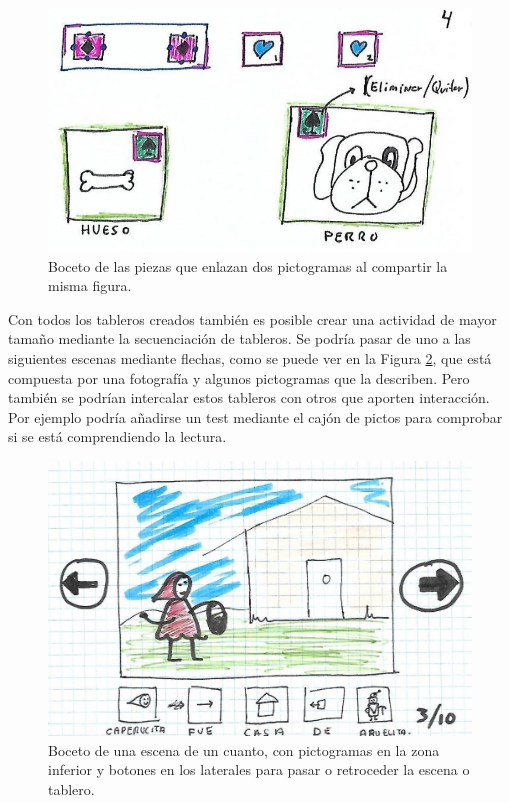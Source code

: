\begin{itemize}
	\begin{figure}[h!]
		\centering
		\includegraphics[width=0.7\linewidth]{Imagenes/Bitmap/componenteEnla}
		\caption{Boceto de las piezas que enlazan dos pictogramas al compartir la misma figura.}
		\label{fig:componenteenla}
	\end{figure}

	
\end{itemize}

Con todos los tableros creados también es posible crear una actividad de mayor tamaño mediante la secuenciación de tableros. Se podría pasar de uno a las siguientes escenas mediante flechas, como se puede ver en la Figura \ref{fig:cuento}, que está compuesta por una fotografía y algunos pictogramas que la describen. Pero también se podrían intercalar estos tableros con otros que aporten interacción. Por ejemplo podría añadirse un test mediante el cajón de pictos para comprobar si se está comprendiendo la lectura.

\begin{figure}[h!]
	\centering
	\includegraphics[width=0.7\linewidth]{Imagenes/Bitmap/Cuento}
	\caption{Boceto de una escena de un cuanto, con pictogramas en la zona inferior y botones en los laterales para pasar o retroceder la escena o tablero.}
	\label{fig:cuento}
\end{figure}


